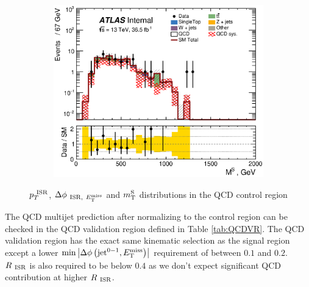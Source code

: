 \begin{figure}[!h]
\begin{center}
\begin{subfigure}[b]{0.40\textwidth}
    \end{subfigure}
        \begin{subfigure}[b]{0.40\textwidth}  
    \includegraphics[width=\textwidth]{figures/QCDJetSmearing/CRQC/MV_36500}
                    \caption{ }
    \end{subfigure}
\caption[$\PTISR$, $\dphiISRI$ and $\MS$ distributions in the QCD control region]{$\PTISR$, $\dphiISRI$ and $\MS$ distributions in the QCD control region}
\label{fig:QCD:CR}
\end{center}
\end{figure}

\indent The QCD multijet prediction after normalizing to the control region can be checked in the QCD validation region defined in Table \ref{tab:QCDVR}.   The QCD validation region has the exact same kinematic selection as the signal region except a lower $\min \left|\Delta\phi\left(\mathrm{jet}^{0-1},E_{\mathrm{T}}^{\mathrm{miss}}\right)\right|$ requirement of between $0.1$ and $0.2$.  $R_{~\mathrm{ISR}}$ is also required to be below $0.4$ as we don't expect significant QCD contribution at higher $R_{~\mathrm{ISR}}$.  \\

